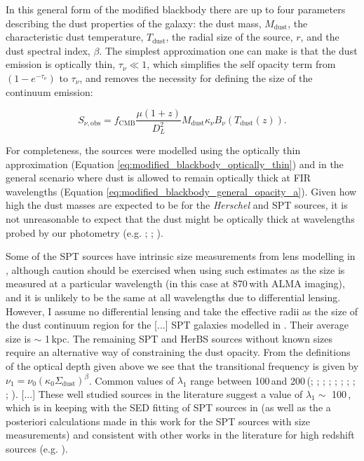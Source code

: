 In this general form of the modified blackbody there are up to four parameters describing the dust properties of the galaxy: the dust mass, $M_{\textrm{dust}}$, the characteristic dust temperature, $T_{\textrm{dust}}$, the radial size of the source, $r$, and the dust spectral index, $\beta$. The simplest approximation one can make is that the dust emission is optically thin, $\tau_\nu \ll 1$, which simplifies the self opacity term from $(1 - e^{-\tau_\nu})$ to $\tau_\nu$, and removes the necessity for defining the size of the continuum emission:

\begin{equation}
	S_{\nu, \textrm{obs}} = f_{\textrm{CMB}}\frac{\mu (1+z)}{D_L^2}M_{\textrm{dust}}\kappa_\nu B_\nu(T_{\textrm{dust}}(z)).
	\label{eq:modified_blackbody_optically_thin}
\end{equation}

For completeness, the sources were modelled using the optically thin approximation (Equation \ref{eq:modified_blackbody_optically_thin}) and in the general scenario where dust is allowed to remain optically thick at FIR wavelengths (Equation \ref{eq:modified_blackbody_general_opacity_a}). Given how high the dust masses are expected to be for the \textit{Herschel} and SPT sources, it is not unreasonable to expect that the dust might be optically thick at wavelengths probed by our photometry (e.g. \citealt{Conley_2011}; \citealt{Casey_2019}; \citealt{Cortzen_2020}). 

Some of the SPT sources have intrinsic size measurements from lens modelling in \citealt{Spilker_2016}, although caution should be exercised when using such estimates as the size is measured at a particular wavelength (in this case at 870\,\micron with ALMA imaging), and it is unlikely to be the same at all wavelengths due to differential lensing. However, I assume no differential lensing and take the effective radii as the size of the dust continuum region for the [...] SPT galaxies modelled in \citealt{Spilker_2016}. Their average size is $\sim$ 1\,kpc. The remaining SPT and HerBS sources without known sizes require an alternative way of constraining the dust opacity. From the definitions of the optical depth given above we see that the transitional frequency is given by $\nu_1 = \nu_0(\kappa_0 \Sigma_{\textrm{dust}})^\beta$. Common values of $\lambda_1$ range between 100\,\micron and 200\,\micron (\citealt{Blain_2003}; \citealt{Draine_2006}; \citealt{Conley_2011}; \citealt{Rangwala_2011}; \citealt{Greve_2012}; \citealt{Casey_2014}; \citealt{Spilker_2016}; \citealt{Casey_2019}; \citealt{Cooper_2022}; \citealt{Drew_2022}). [...] These well studied sources in the literature suggest a value of $\lambda_1 \sim$ 100\,\micron, which is in keeping with the SED fitting of SPT sources in \citealt{Spilker_2016} (as well as the a posteriori calculations made in this work for the SPT sources with size measurements) and consistent with other works in the literature for high redshift sources (e.g. ). 

